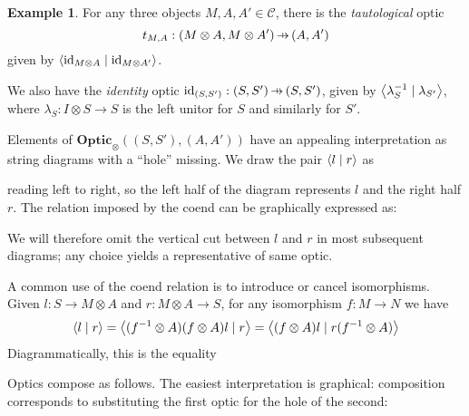 \documentclass[11pt,letterpaper]{article}
\theoremstyle{plain}
\theoremstyle{definition}
\newtheorem{example}[theorem]{Example}
\newcommand{\C}{\mathscr{C}}
\newcommand{\Optic}{\mathbf{Optic}}
\newcommand{\id}{\mathrm{id}}
\newcommand{\rep}[2]{{\ensuremath \left\langle #1 \mid #2 \right\rangle}}
\newcommand{\hto}{\ensuremath{\,\mathaccent\shortmid\rightarrow\,}}
\begin{document}
\begin{example}
  For any three objects $M, A, A' \in \C$, there is the \emph{tautological} optic \[t_{M,A} : (M \otimes A, M \otimes A') \hto (A, A')\] given by $\rep{\id_{M \otimes A}}{\id_{M \otimes A'}}$.

  We also have the \emph{identity} optic $\id_{(S, S')} : (S, S') \hto (S, S')$, given by $\rep{\lambda^{-1}_S}{\lambda_{S'}}$, where $\lambda_S : I \otimes S \to S$ is the left unitor for $S$ and similarly for $S'$.
\end{example}

  Elements of $\Optic_\otimes((S, S'), (A, A'))$ have an appealing
  interpretation as string diagrams with a ``hole'' missing. We draw the
  pair $\rep{l}{r}$ as
  \begin{center}
    
  \end{center}
  reading left to right, so the left half of the diagram represents $l$ and the right half $r$. The relation imposed by the coend can be graphically expressed as:
  \begin{center}
    
    \qquad
    
  \end{center}
  We will therefore omit the vertical cut between $l$ and $r$ in most subsequent diagrams; any choice yields a representative of same optic.

A common use of the coend relation is to introduce or cancel isomorphisms. Given $l : S \to M \otimes A$ and $r : M \otimes A \to S$, for any isomorphism $f : M \to N$ we have
\begin{align*}
\rep{l}{r} = \rep{(f^{-1} \otimes A)(f \otimes A)l}{r} = \rep{(f \otimes A)l}{r(f^{-1} \otimes A)}
\end{align*}
Diagrammatically, this is the equality
  \begin{center}
    
    \qquad \raisebox{1.5cm}{$=$} \qquad
    
  \end{center}

Optics compose as follows. The easiest interpretation is graphical: composition corresponds to substituting the first optic for the hole of the second:
\begin{center}
  
  \quad\raisebox{1.5cm}{$\circ$}\qquad
   \\
  \raisebox{1.5cm}{$:=$}\qquad
  
\end{center}
\end{document}
